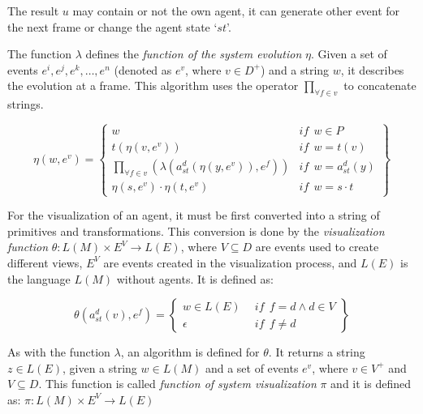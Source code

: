 \documentclass[a4paper,twoside]{article}
\begin{document}
The result $u$ may contain or not the own agent, it can generate other event for the next frame or
change the agent state `$st$'.

The function $\lambda$ defines the \textit{function of the system evolution} $\eta$. Given a set of
events $e^i, e^j, e^k, \dots, e^n$ (denoted as $e^v$, where $v \in D^+$) and a string $w$, it
describes the evolution at a frame. This algorithm uses the operator $\prod_{\forall f \in v}$ to
concatenate strings.

\begin{small}
\begin{equation}
    \eta (w, e^v) = \left\{
    \begin{array}{ll}
        w   & \mathit{if}  \ \ w \in P  \\

        t(\eta (v, e^v))    & \mathit{if}  \ \  w = t(v)  \\

        \underset{\forall f \in v}{ \prod }(\lambda (a_{st}^d (\eta
            (y, e^v)), e^f))    & \mathit{if}  \ \ w = a_{st}^d(y) \\

        \eta (s, e^v) \cdot \eta (t, e^v)   & \mathit{if}  \
\  w = s \cdot t
    \end{array}\right\}
\end{equation}
\end{small}

For the visualization of an agent, it must be first converted into a string of primitives and
transformations. This conversion is done by the \textit{visualization function} $\theta: L(M)
\times E^V \rightarrow L(E)$, where $V \subseteq D$ are events used to create different views,
$E^V$ are events created in the visualization process, and $L(E)$ is the language $L(M)$ without
agents. It is defined as:

\begin{small}
\begin{equation}
    \theta (a_{st}^d(v), e^f) =
    \left\{
    \begin{array}{ll}
        w \in L(E) & \ \ \mathit{if}  \ \ f = d \wedge d \in V \\
        \epsilon  & \ \ \mathit{if}  \ \ f \neq d
    \end{array}\right\}
\end{equation}
\end{small}

As with the function $\lambda$, an algorithm is defined for $\theta$. It returns a string $z \in
L(E)$, given a string $w \in L(M)$ and a set of events $e^v$, where $v \in V^+$ and $V \subseteq
D$. This function is called \textit{function of system visualization} $\pi$ and it is defined as:
$\pi: L(M) \times E^V \rightarrow L(E)$
\end{document}
